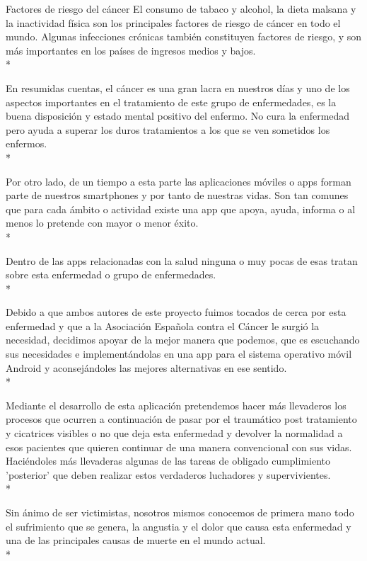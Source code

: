 \documentclass[../pfc.tex]{subfiles}
\begin{document}
Factores de riesgo del cáncer
El consumo de tabaco y alcohol, la dieta malsana y la inactividad física son los principales factores de riesgo de cáncer en todo el mundo. Algunas infecciones crónicas también constituyen factores de riesgo, y son más importantes en los países de ingresos medios y bajos.\\*

En resumidas cuentas, el cáncer es una gran lacra en nuestros días \cite{OMS} y uno de los aspectos importantes en el tratamiento de este grupo de enfermedades, es la buena disposición y estado mental positivo del enfermo. No cura la enfermedad pero ayuda a superar los duros tratamientos a los que se ven sometidos los enfermos.\\*

Por otro lado, de un tiempo a esta parte las aplicaciones móviles o apps forman parte de nuestros smartphones y por tanto de nuestras vidas. Son tan comunes que para cada ámbito o actividad existe una app que apoya, ayuda, informa o al menos lo pretende con mayor o menor éxito.\\*

Dentro de las apps relacionadas con la salud ninguna o muy pocas de esas tratan sobre esta enfermedad o grupo de enfermedades.\\*

Debido a que ambos autores de este proyecto fuimos tocados de cerca por esta enfermedad y que a la Asociación Española contra el Cáncer le surgió la necesidad, decidimos apoyar de la mejor manera que podemos, que es escuchando sus necesidades e implementándolas en una app para el sistema operativo móvil Android y aconsejándoles las mejores alternativas en ese sentido. \\*

Mediante el desarrollo de esta aplicación pretendemos hacer más llevaderos los procesos que ocurren a continuación de pasar por el traumático post tratamiento y cicatrices visibles o no que deja esta enfermedad y devolver la normalidad a esos pacientes que quieren continuar de una manera convencional con sus vidas. Haciéndoles más llevaderas algunas de las tareas de obligado cumplimiento 'posterior' que deben realizar estos verdaderos luchadores y supervivientes.\\*

Sin ánimo de ser victimistas, nosotros mismos conocemos de primera mano todo el sufrimiento que se genera, la angustia y el dolor que causa esta enfermedad y una de las principales causas de muerte en el mundo actual.\\*
\end{document}
